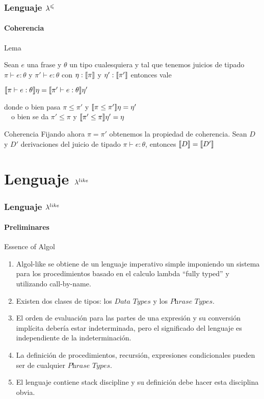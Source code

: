 \documentclass{beamer}
\begin{document}
\begin{frame}
\frametitle{Lenguaje $\lambda^{\leqslant}$}
\framesubtitle{Coherencia}

\begin{block}{Lema}

Sean $e$ una frase y $\theta$ un tipo cualesquiera y tal que tenemos 
juicios de tipado $\pi \vdash e : \theta$ y $\pi' \vdash e : \theta$
con $\eta : \llbracket \pi \rrbracket$ y $\eta' : \llbracket \pi' \rrbracket$ entonces vale

\begin{center}
$\llbracket \pi \vdash e : \theta \rrbracket\eta = \llbracket \pi' \vdash e : \theta \rrbracket\eta'$
\end{center}

\noindent
donde o bien pasa $\pi \leq \pi'$ y $\llbracket \pi \leq \pi' \rrbracket\eta = \eta'$\\
\quad \quad \ \
o bien se da $\pi' \leq \pi$ y $\llbracket \pi' \leq \pi \rrbracket\eta' = \eta$

\end{block}

\begin{block}{Coherencia}
Fijando ahora $\pi = \pi'$ obtenemos la propiedad de coherencia. Sean $D$ y $D'$
derivaciones del juicio de tipado $\pi \vdash e : \theta$, entonces 
$\llbracket D \rrbracket = \llbracket D' \rrbracket$
\end{block}

\end{frame}

\section{Lenguaje $\lambda^{like}$}

\begin{frame}
\frametitle{Lenguaje $\lambda^{like}$}
\framesubtitle{Preliminares}

\begin{block}{Essence of Algol}\small
\begin{enumerate}
\item Algol-like se obtiene de un lenguaje imperativo simple imponiendo un
sistema para los procedimientos basado en el calculo lambda ``fully typed'' y utilizando
call-by-name.

\item Existen dos clases de tipos: los $\textit{Data Types}$ y los $\textit{Phrase Types}$.

\item El orden de evaluaci\'on para las partes de una expresi\'on y su
conversi\'on impl\'icita deber\'ia estar indeterminada, pero el significado
del lenguaje es independiente de la indeterminaci\'on.

\item La definici\'on de procedimientos, recursi\'on, expresiones condicionales
pueden ser de cualquier $\textit{Phrase Types}$.

\item El lenguaje contiene stack discipline y su definici\'on debe hacer esta disciplina
obvia.
\end{enumerate}

\end{block}

\end{frame}
\end{document}

